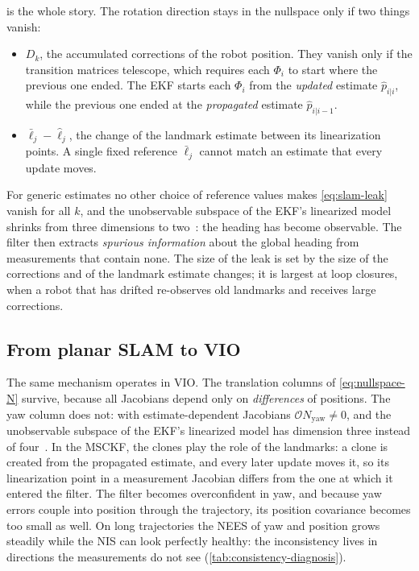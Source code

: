  is the whole story. The rotation direction stays in the nullspace only if two things vanish:
\begin{itemize}
  \item $D_k$, the accumulated corrections of the robot position. They vanish only if the transition matrices telescope, which requires each $\Phi_i$
        to start where the previous one ended. The EKF starts each $\Phi_i$ from the \emph{updated} estimate $\hat p_{i|i}$, while the previous one ended at the
        \emph{propagated} estimate $\hat p_{i|i-1}$.
  \item $\bar\ell_j - \hat\ell_j$, the change of the landmark estimate between its linearization points. A single fixed reference $\bar\ell_j$ cannot match an
        estimate that every update moves.
\end{itemize}
For generic estimates no other choice of reference values makes \eqref{eq:slam-leak} vanish for all $k$, and the unobservable subspace of the EKF's
linearized model shrinks from three dimensions to two~\cite{huang2010observability}: the heading has become observable. The filter then extracts
\emph{spurious information} about the global heading from measurements that contain none. The size of the leak is set by the size of the
corrections and of the landmark estimate changes; it is largest at loop closures, when a robot that has drifted re-observes old landmarks
and receives large corrections.

\subsection{From planar SLAM to VIO}

The same mechanism operates in VIO. The translation columns of \eqref{eq:nullspace-N} survive, because all Jacobians depend only on
\emph{differences} of positions. The yaw column does not: with estimate-dependent Jacobians $\mathcal{O}N_{\text{yaw}} \neq 0$, and the unobservable
subspace of the EKF's linearized model has dimension three instead of four~\cite{li2013msckf2, hesch2014consistency}. In the MSCKF, the
clones play the role of the landmarks: a clone is created from the propagated estimate, and every later update moves it, so its linearization
point in a measurement Jacobian differs from the one at which it entered the filter. The filter becomes overconfident in yaw, and because
yaw errors couple into position through the trajectory, its position covariance becomes too small as well. On long trajectories the NEES of
yaw and position grows steadily while the NIS can look perfectly healthy: the inconsistency lives in directions the measurements do not see
(\cref{tab:consistency-diagnosis}).

